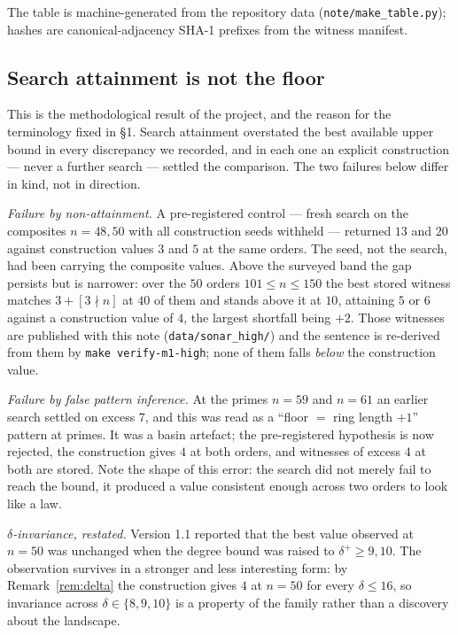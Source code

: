 \documentclass[11pt]{amsart}
\theoremstyle{remark}
\begin{document}
The table is machine-generated from the repository data
(\texttt{note/make\_table.py}); hashes are canonical-adjacency SHA-1 prefixes
from the witness manifest.

\begin{center}
\small

\end{center}

\subsection{Search attainment is not the floor}\label{sec:notfloor}

This is the methodological result of the project, and the reason for the
terminology fixed in \S1. Search attainment overstated the best available
upper bound in every discrepancy we recorded, and in each one an explicit
construction --- never a further search --- settled the comparison. The two
failures below differ in kind, not in direction.

\emph{Failure by non-attainment.} A pre-registered control --- fresh search on the composites
$n = 48, 50$ with all construction seeds withheld --- returned $13$ and $20$
against construction values $3$ and $5$ at the same orders. The seed, not the
search, had been carrying the composite values. Above the surveyed band the
gap persists but is narrower: over the $50$ orders $101 \le n \le 150$ the
best stored witness matches $3 + [3 \nmid n]$ at $40$ of them and stands above
it at $10$, attaining $5$ or $6$ against a construction value of $4$, the
largest shortfall being $+2$. Those witnesses are published with this note
(\texttt{data/sonar\_high/}) and the sentence is re-derived from them by
\texttt{make verify-m1-high}; none of them falls \emph{below} the
construction value.

\emph{Failure by false pattern inference.} At the primes $n = 59$ and $n = 61$ an earlier search settled
on excess $7$, and this was read as a ``floor $=$ ring length $+ 1$'' pattern
at primes. It was a basin artefact; the pre-registered hypothesis is now
rejected, the construction gives $4$ at both orders, and witnesses of excess
$4$ at both are stored. Note the shape of this error: the search did not
merely fail to reach the bound, it produced a value consistent enough across
two orders to look like a law.

\emph{$\delta$-invariance, restated.} Version 1.1 reported that the best value
observed at $n = 50$ was unchanged when the degree bound was raised to
$\delta^+ \ge 9, 10$. The observation survives in a stronger and less
interesting form: by Remark~\ref{rem:delta} the construction gives $4$ at
$n = 50$ for every $\delta \le 16$, so invariance across $\delta \in
\{8,9,10\}$ is a property of the family rather than a discovery about the
landscape.
\end{document}
